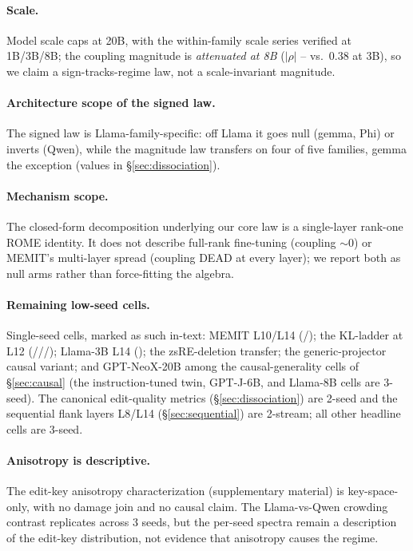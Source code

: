 \paragraph{Scale.} Model scale caps at 20B, with the within-family
scale series verified at 1B/3B/8B; the coupling magnitude is \emph{attenuated
at 8B} ($|\rho|$ \regimeMagAttenLo{}--\regimeMagAttenHi{} vs.\ $0.38$ at 3B),
so we claim a sign-tracks-regime law, not a scale-invariant magnitude.

\paragraph{Architecture scope of the signed law.} The signed law is
Llama-family-specific: off Llama it goes null (gemma, Phi) or inverts (Qwen),
while the magnitude law transfers on four of five families, gemma the
exception (values in \S\ref{sec:dissociation}).

\paragraph{Mechanism scope.} The closed-form decomposition underlying our
core law is a single-layer rank-one ROME identity. It does not describe
full-rank fine-tuning (coupling $\sim$0) or MEMIT's multi-layer spread
(coupling DEAD at every layer); we report both as null arms rather than
force-fitting the algebra.

\paragraph{Remaining low-seed cells.} Single-seed cells, marked as such
in-text: MEMIT L10/L14 (\memitRhoLten{}/\memitRhoLfourteen{}); the KL-ladder at
L12 (\klLtwelveZeroThree{}/\klLtwelveOne{}/\klLtwelveThree{}/\klLtwelveFull{});
Llama-3B L14 (\llamaThreeBLfourteen{}); the zsRE-deletion transfer; the
generic-projector causal variant; and GPT-NeoX-20B among the
causal-generality cells of \S\ref{sec:causal} (the instruction-tuned twin,
GPT-J-6B, and Llama-8B cells are 3-seed). The canonical edit-quality metrics
(\S\ref{sec:dissociation}) are 2-seed and the sequential flank layers L8/L14
(\S\ref{sec:sequential}) are 2-stream; all other headline cells are 3-seed.

\paragraph{Anisotropy is descriptive.} The edit-key anisotropy
characterization (supplementary material) is key-space-only, with no damage
join and no causal claim. The Llama-vs-Qwen crowding contrast replicates
across 3 seeds, but the per-seed spectra remain a description of the edit-key
distribution, not evidence that anisotropy causes the regime.

